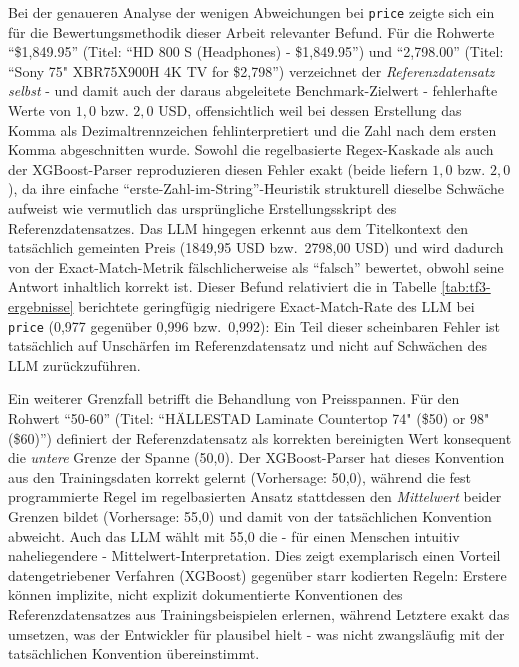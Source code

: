 Bei der genaueren Analyse der wenigen Abweichungen bei \texttt{price} zeigte
sich ein für die Bewertungsmethodik dieser Arbeit relevanter Befund. Für die
Rohwerte \enquote{\$1,849.95} (Titel: \enquote{HD 800 S (Headphones) -
\$1,849.95}) und \enquote{2,798.00} (Titel: \enquote{Sony 75" XBR75X900H 4K TV
for \$2,798}) verzeichnet der \emph{Referenzdatensatz selbst} - und damit auch
der daraus abgeleitete Benchmark-Zielwert - fehlerhafte Werte von $1{,}0$ bzw.
$2{,}0$ USD, offensichtlich weil bei dessen Erstellung das Komma als
Dezimaltrennzeichen fehlinterpretiert und die Zahl nach dem ersten Komma
abgeschnitten wurde. Sowohl die regelbasierte Regex-Kaskade als auch der
XGBoost-Parser reproduzieren diesen Fehler exakt (beide liefern $1{,}0$ bzw.
$2{,}0$), da ihre einfache \enquote{erste-Zahl-im-String}-Heuristik strukturell
dieselbe Schwäche aufweist wie vermutlich das ursprüngliche Erstellungsskript
des Referenzdatensatzes. Das LLM hingegen erkennt aus dem Titelkontext den
tatsächlich gemeinten Preis (1849{,}95 USD bzw.\ 2798{,}00 USD) und wird
dadurch von der Exact-Match-Metrik fälschlicherweise als \enquote{falsch}
bewertet, obwohl seine Antwort inhaltlich korrekt ist. Dieser Befund relativiert
die in Tabelle \ref{tab:tf3-ergebnisse} berichtete geringfügig niedrigere
Exact-Match-Rate des LLM bei \texttt{price} (0{,}977 gegenüber 0{,}996 bzw.\
0{,}992): Ein Teil dieser scheinbaren Fehler ist tatsächlich auf Unschärfen im
Referenzdatensatz und nicht auf Schwächen des LLM zurückzuführen.

Ein weiterer Grenzfall betrifft die Behandlung von Preisspannen. Für den
Rohwert \enquote{50-60} (Titel: \enquote{HÄLLESTAD Laminate Countertop 74"
(\$50) or 98" (\$60)}) definiert der Referenzdatensatz als korrekten
bereinigten Wert konsequent die \emph{untere} Grenze der Spanne (50{,}0). Der
XGBoost-Parser hat dieses Konvention aus den Trainingsdaten korrekt gelernt
(Vorhersage: 50{,}0), während die fest programmierte Regel im
regelbasierten Ansatz stattdessen den \emph{Mittelwert} beider Grenzen bildet
(Vorhersage: 55{,}0) und damit von der tatsächlichen Konvention abweicht. Auch
das LLM wählt mit 55{,}0 die - für einen Menschen intuitiv naheliegendere -
Mittelwert-Interpretation. Dies zeigt exemplarisch einen Vorteil datengetriebener
Verfahren (XGBoost) gegenüber starr kodierten Regeln: Erstere können implizite,
nicht explizit dokumentierte Konventionen des Referenzdatensatzes aus
Trainingsbeispielen erlernen, während Letztere exakt das umsetzen, was der
Entwickler für plausibel hielt - was nicht zwangsläufig mit der tatsächlichen
Konvention übereinstimmt.

